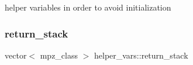 helper variables in order to avoid initialization 

\mbox{\label{namespacehelper__vars_a6d2100c373830cacd232319a9958652d}} 
\subsubsection{\texorpdfstring{return\+\_\+stack}{return\_stack}}
{\footnotesize\ttfamily vector$<$ mpz\+\_\+class $>$ helper\+\_\+vars\+::return\+\_\+stack}

